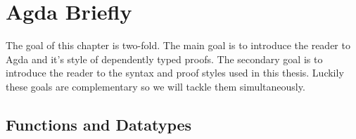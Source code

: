 \documentclass[./Thesis.tex]{subfiles}
\begin{document}
\chapter{Agda Briefly}
\label{chap:agda-briefly}

The goal of this chapter is two-fold. The main goal is to introduce the reader
to Agda and it's style of dependently typed proofs. The secondary goal is to
introduce the reader to the syntax and proof styles used in this thesis. Luckily
these goals are complementary so we will tackle them simultaneously.

\section{Functions and Datatypes}
\label{sec:functions-and-datatypes}
\end{document}
